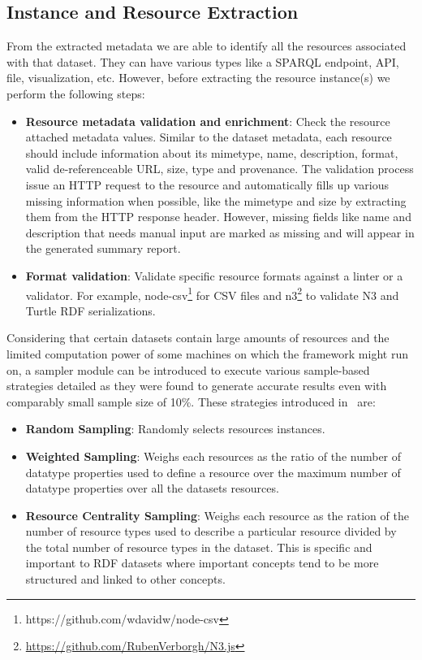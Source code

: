 \documentclass[runningheads,a4paper]{../../Util/LaTEX/llncs}
\begin{document}
\subsection{Instance and Resource Extraction}
From the extracted metadata we are able to identify all the resources associated with that dataset. They can have various types like a SPARQL endpoint, API, file, visualization, etc. However, before extracting the resource instance(s) we perform the following steps:
\begin{itemize}
  \item \textbf{Resource metadata validation and enrichment}: Check the resource attached metadata values. Similar to the dataset metadata, each resource should include information about its mimetype, name, description, format, valid de-referenceable URL, size, type and provenance. The validation process issue an HTTP request to the resource and automatically fills up various missing information when possible, like the mimetype and size by extracting them from the HTTP response header. However, missing fields like name and description that needs manual input are marked as missing and will appear in the generated summary report.
  \item \textbf{Format validation}: Validate specific resource formats against a linter or a validator. For example, node-csv\footnote{https://github.com/wdavidw/node-csv} for CSV files and n3\footnote{\url{https://github.com/RubenVerborgh/N3.js}} to validate N3 and Turtle RDF serializations.
\end{itemize}

Considering that certain datasets contain large amounts of resources and the limited computation power of some machines on which the framework might run on, a sampler module can be introduced to execute various sample-based strategies detailed as they were found to generate accurate results even with comparably small sample size of 10\%. These strategies introduced in~\cite{Fetahu:ESWC:14} are:
\begin{itemize}
  \item \textbf{Random Sampling}: Randomly selects resources instances.
  \item \textbf{Weighted Sampling}: Weighs each resources as the ratio of the number of datatype properties used to define a resource over the maximum number of datatype properties over all the datasets resources.
  \item \textbf{Resource Centrality Sampling}: Weighs each resource as the ration of the number of resource types used to describe a particular resource divided by the total number of resource types in the dataset. This is specific and important to RDF datasets where important concepts tend to be more structured and linked to other concepts.
\end{itemize}
\end{document}
